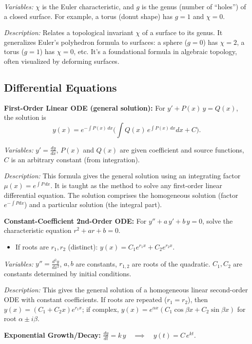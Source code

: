 \documentclass{article}
\begin{document}
\textit{Variables:} $\chi$ is the Euler characteristic, and $g$ is the genus (number of “holes”) of a closed surface. For example, a torus (donut shape) has $g=1$ and $\chi = 0$.

\textit{Description:} Relates a topological invariant $\chi$ of a surface to its genus. It generalizes Euler’s polyhedron formula to surfaces: a sphere ($g=0$) has $\chi=2$, a torus ($g=1$) has $\chi=0$, etc. It’s a foundational formula in algebraic topology, often visualized by deforming surfaces.

\subsection*{Differential Equations}

\textbf{First-Order Linear ODE (general solution):} For $y' + P(x)\,y = Q(x)$, the solution is
\[
y(x) = e^{-\int P(x)\,dx}\Big(\int Q(x)\,e^{\int P(x)\,dx}dx + C\Big).
\]

\textit{Variables:} $y' = \frac{dy}{dx}$, $P(x)$ and $Q(x)$ are given coefficient and source functions, $C$ is an arbitrary constant (from integration).

\textit{Description:} This formula gives the general solution using an integrating factor $\mu(x)=e^{\int P\,dx}$. It is taught as the method to solve any first-order linear differential equation. The solution comprises the homogeneous solution (factor $e^{-\int P dx}$) and a particular solution (the integral part).

\textbf{Constant-Coefficient 2nd-Order ODE:} For $y'' + a\,y' + b\,y = 0$, solve the characteristic equation $r^2 + a r + b = 0$.

\begin{itemize}
\item If roots are $r_1, r_2$ (distinct): $y(x) = C_1 e^{r_1 x} + C_2 e^{r_2 x}$.
\end{itemize}

\textit{Variables:} $y'' = \frac{d^2y}{dx^2}$, $a, b$ are constants, $r_{1,2}$ are roots of the quadratic. $C_1, C_2$ are constants determined by initial conditions.

\textit{Description:} This gives the general solution of a homogeneous linear second-order ODE with constant coefficients. If roots are repeated ($r_1=r_2$), then $y(x) = (C_1 + C_2 x)e^{r_1 x}$; if complex, $y(x)=e^{\alpha x}(C_1\cos\beta x + C_2\sin\beta x)$ for root $\alpha \pm i\beta$.

\textbf{Exponential Growth/Decay:} $\displaystyle \frac{dy}{dt} = k\,y \quad\implies\quad y(t) = C\,e^{k t}$.
\end{document}
